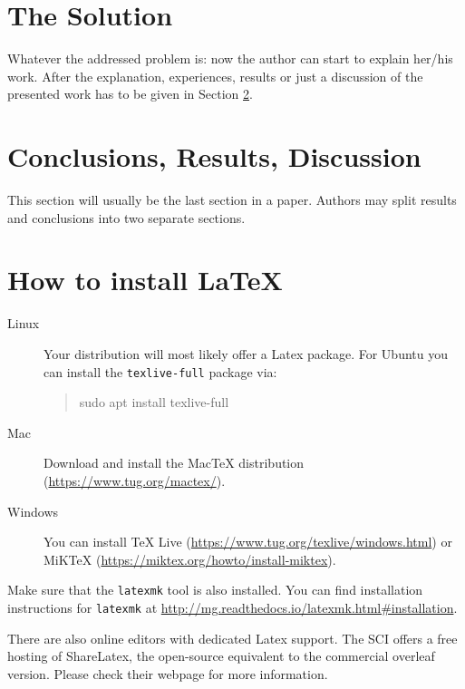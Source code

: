 \documentclass[]{tukseminar}
\newenvironment{displayshellcommand}{%
	\begin{quote}%
	\ttfamily%
}{%
	\end{quote}%
}
\begin{document}
\section{The Solution}
\label{sec:solution}

Whatever the addressed problem is: now the author can start to explain her/his work.
After the explanation, experiences, results or just a discussion of the presented work has to be given in Section \ref{sec:conclusions}.

\section{Conclusions, Results, Discussion}
\label{sec:conclusions}

This section will usually be the last section in a paper.
Authors may split results and conclusions into two separate sections.



\newpage

\section{How to install \LaTeX{}}

\begin{description}
 \item[Linux]
Your distribution will most likely offer a Latex package.
For Ubuntu you can install the \lstinline!texlive-full! package via:

\begin{displayshellcommand}
  sudo apt install texlive-full
\end{displayshellcommand}

\item[Mac]
Download and install the MacTeX distribution (\url{https://www.tug.org/mactex/}).

\item[Windows]
You can install TeX Live (\url{https://www.tug.org/texlive/windows.html}) or MiKTeX (\url{https://miktex.org/howto/install-miktex}).
\end{description}

Make sure that the \lstinline!latexmk! tool is also installed.
You can find installation instructions for \lstinline!latexmk! at \url{http://mg.readthedocs.io/latexmk.html#installation}.

There are also online editors with dedicated Latex support.
The SCI offers a free hosting of ShareLatex, the open-source equivalent to the commercial overleaf version.
Please check their webpage for more information.
\end{document}
